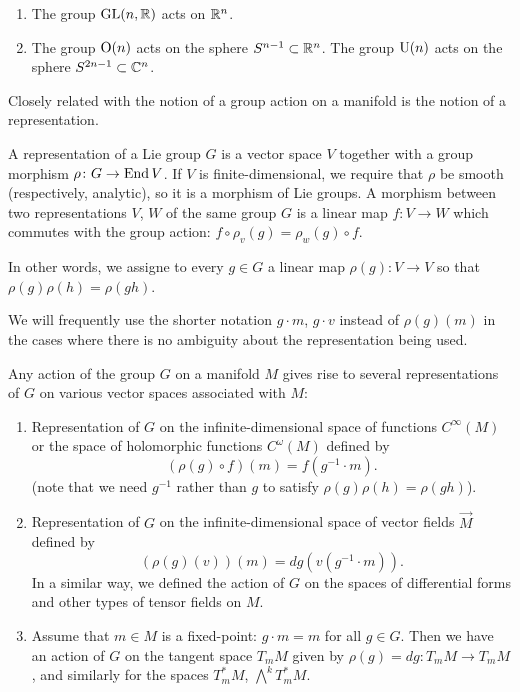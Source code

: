 \begin{example}
  \hfill
  \begin{enumerate}[label=(\arabic*)]
  \item The group $\mathrm{GL}(n,\mathbb{R})$ acts on $\mathbb{R}^n$.
  \item The group $\mathrm{O}(n)$ acts on the sphere $S^{n-1}\subset\mathbb{R}^n$. The
    group $\mathrm{U}(n)$ acts on the sphere $S^{2n-1}\subset\mathbb{C}^n$.
  \end{enumerate}
\end{example}
Closely related with the notion of a group action on a manifold is the
notion of a representation.

\begin{definition}
  A representation of a Lie group $G$ is a vector space $V$ together with a
  group morphism $\rho\colon G\to\operatorname{End} V$. If $V$ is finite-dimensional, we
  require that $\rho$ be smooth (respectively, analytic), so it is a
  morphism of Lie groups. A morphism between two representations $V$, $W$
  of the same group $G$ is a linear map $f\colon V\to W$ which commutes
  with the group action: $f\circ\rho_v(g)=\rho_w(g)\circ f$.
\end{definition}

In other words, we assigne to every $g\in G$ a linear map
$\rho(g)\colon V\to V$ so that $\rho(g)\rho(h)=\rho(gh)$.

We will frequently use the shorter notation $g\cdot m$, $g\cdot v$ instead
of $\rho(g)(m)$ in the cases where there is no ambiguity about the
representation being used.

Any action of the group $G$ on a manifold $M$ gives rise to several
representations of $G$ on various vector spaces associated with $M$:
\begin{enumerate}[label=(\arabic*)]
\item Representation of $G$ on the infinite-dimensional space of functions
  $C^\infty(M)$ or the space of holomorphic functions $C^\omega(M)$ defined
  by
  \[
    (\rho(g)\circ f)(m)= f(g^{-1}\cdot m).
  \]
  (note that we need $g^{-1}$ rather than $g$ to satisfy
  $\rho(g)\rho(h)=\rho(gh)$).
\item Representation of $G$ on the infinite-dimensional space of vector
  fields $\Vec M$ defined by
  \[
    (\rho(g)(v))(m)= dg(v(g^{-1}\cdot m)).
  \]
  In a similar way, we defined the action of $G$ on the spaces of
  differential forms and other types of tensor fields on $M$.
\item Assume that $m\in M$ is a fixed-point: $g\cdot m=m$ for all $g\in
  G$. Then we have an action of $G$ on the tangent space $T_mM$ given by
  $\rho(g)=dg\colon T_mM\to T_mM$, and similarly for the spaces $T_m^*M$,
  $\bigwedge^k T_m^*M$.
\end{enumerate}


